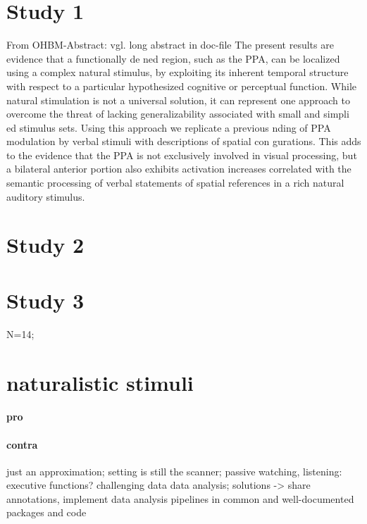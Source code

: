 \section{Study 1}
%
From OHBM-Abstract: vgl. long abstract in doc-file
%
The present results are evidence that a functionally de ned region, such as the
PPA, can be localized using a complex natural stimulus, by exploiting its
inherent temporal structure with respect to a particular hypothesized cognitive
or perceptual function.
%
While natural stimulation is not a universal solution, it can represent one
approach to overcome the threat of lacking generalizability associated with
small and simpli ed stimulus sets.
%
Using this approach we replicate a previous nding of PPA modulation by verbal
stimuli with descriptions of spatial con gurations.
%
This adds to the evidence that the PPA is not exclusively involved in visual
processing, but a bilateral anterior portion also exhibits activation increases
correlated with the semantic processing of verbal statements of spatial
references in a rich natural auditory stimulus.


\section{Study 2}



\section{Study 3}

N=14;


\section{naturalistic stimuli}

\paragraph{pro}





\paragraph{contra}
%
just an approximation;
%
setting is still the scanner;
%
passive watching, listening: executive functions?
%
challenging data data analysis;
%
solutions -> share annotations,
%
implement data analysis pipelines in common and well-documented packages and code


